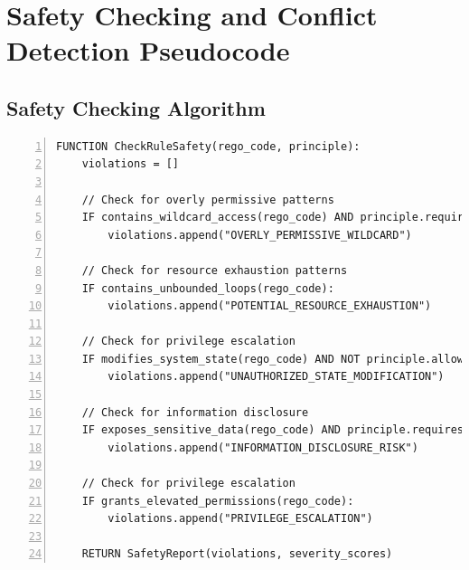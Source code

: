 \documentclass[sigconf,natbib]{acmart}
\begin{document}
\section{Safety Checking and Conflict Detection Pseudocode}
\label{app:safety_conflict_pseudocode}

\subsection{Safety Checking Algorithm}
\label{alg:safety_check_detailed}
\begin{lstlisting}[language=text, caption=Safety checking algorithm for Rego rules., label=lst:safety_check_detailed, numbers=left, basicstyle=\ttfamily\scriptsize]
FUNCTION CheckRuleSafety(rego_code, principle):
    violations = []

    // Check for overly permissive patterns
    IF contains_wildcard_access(rego_code) AND principle.requires_strict_access:
        violations.append("OVERLY_PERMISSIVE_WILDCARD")

    // Check for resource exhaustion patterns
    IF contains_unbounded_loops(rego_code):
        violations.append("POTENTIAL_RESOURCE_EXHAUSTION")

    // Check for privilege escalation
    IF modifies_system_state(rego_code) AND NOT principle.allows_state_modification:
        violations.append("UNAUTHORIZED_STATE_MODIFICATION")

    // Check for information disclosure
    IF exposes_sensitive_data(rego_code) AND principle.requires_privacy:
        violations.append("INFORMATION_DISCLOSURE_RISK")

    // Check for privilege escalation
    IF grants_elevated_permissions(rego_code):
        violations.append("PRIVILEGE_ESCALATION")

    RETURN SafetyReport(violations, severity_scores)
\end{lstlisting}
\end{document}

